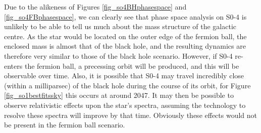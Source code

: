 Due to the alikeness of Figures \ref{fig_so4BHphasespace} and \ref{fig_so4FBphasespace}, we can clearly see that phase space analysis on
S0-4 is unlikely to
be able to tell us much about the mass structure of the galactic centre. As the star would be located on the outer edge of the fermion ball,
the enclosed mass is almost that of the black hole, and the resulting dynamics are therefore very similar to those of the black hole scenario.
However, if S0-4 re-enters the fermion ball, a precessing orbit will be produced, and this will be observable over time. Also, it is
possible that S0-4 may travel incredibly close (within a milliparsec) of the black hole during the course of its orbit, for
Figure \ref{fig_so1bestfitssky} this occurs at around 2047. It may then be possible to observe relativistic effects upon
the star's spectra, assuming the technology to resolve these spectra will improve by that time. Obviously these effects would not be
present in the fermion ball scenario.

